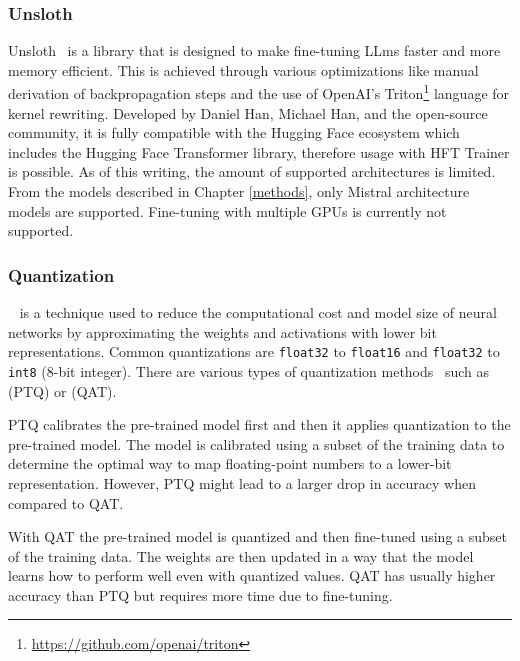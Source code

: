 \documentclass[english, ba, kiv, he, iso690numb, pdf, viewonly]{fasthesis}
\begin{document}
\subsubsection{Unsloth}\label{impl:unsloth}
Unsloth~\cite{unsloth} is a library that is designed to make fine-tuning LLms faster and more memory efficient. This is achieved through various optimizations like manual derivation of backpropagation steps and the use of OpenAI's Triton\footnote{\url{https://github.com/openai/triton}} language for kernel rewriting. Developed by Daniel Han, Michael Han, and the open-source community, it is fully compatible with the Hugging Face ecosystem which includes the Hugging Face Transformer library, therefore usage with HFT Trainer is possible. As of this writing, the amount of supported architectures is limited. From the models described in Chapter \ref{methods}, only Mistral architecture models are supported. Fine-tuning with multiple GPUs is currently not supported.
\subsubsection{Quantization}
~\cite{jacob2017quantization} is a technique used to reduce the computational cost and model size of neural networks by approximating the weights and activations with lower bit representations. Common quantizations are \texttt{float32} to \texttt{float16} and \texttt{float32} to \texttt{int8} (8-bit integer). There are various types of quantization methods~\cite{gholami2021survey} such as  (PTQ) or  (QAT). 

PTQ calibrates the pre-trained model first and then it applies quantization to the pre-trained model. The model is calibrated using a subset of the training data to determine the optimal way to map floating-point numbers to a lower-bit representation. However, PTQ might lead to a larger drop in accuracy when compared to QAT.

With QAT the pre-trained model is quantized and then fine-tuned using a subset of the training data. The weights are then updated in a way that the model learns how to perform well even with quantized values. QAT has usually higher accuracy than PTQ but requires more time due to fine-tuning.
\end{document}
